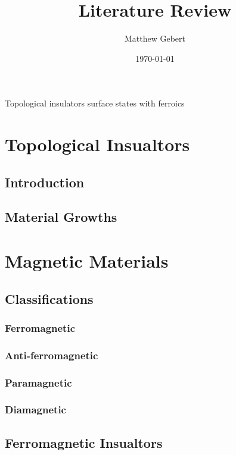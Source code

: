 \documentclass{article} %
\title{Literature Review}
\date{\today}
\author{Matthew Gebert}
\begin{document}
	\maketitle
	\begingroup
	\centering
		\vspace{5mm}\LARGE Topological insulators surface states with ferroics\\\vspace{1.5cm}	
	\endgroup
	\normalfont\normalsize
		
		
\section{Topological Insualtors}
\subsection{Introduction}
\subsection{Material Growths}

\section{Magnetic Materials}
\subsection{Classifications}
\subsubsection{Ferromagnetic}
\subsubsection{Anti-ferromagnetic}
\subsubsection{Paramagnetic}
\subsubsection{Diamagnetic}
\subsection{Ferromagnetic Insualtors}
\end{document}
